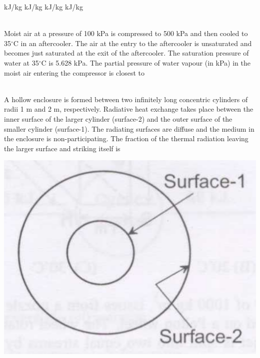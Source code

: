 \documentclass[addpoints,11pt]{exam}
\begin{document}
\begin{questions}
        \begin{oneparchoices}
             kJ/kg
             kJ/kg
             kJ/kg
             kJ/kg
        \end{oneparchoices}\\

        \question Moist air at a pressure of 100 kPa is compressed to 500 kPa and then cooled to 35$^\circ$C in an aftercooler. The air at the entry to the aftercooler is unsaturated and becomes just saturated at the exit of the aftercooler. The saturation pressure of water at 35$^\circ$C is 5.628 kPa. The partial pressure of water vapour (in kPa) in the moist air entering the compressor is closest to\\

        \begin{oneparchoices}
        \end{oneparchoices}\\

        \question A hollow enclosure is formed between two infinitely long concentric cylinders of radii 1 m and 2 m, respectively. Radiative heat exchange takes place between the inner surface of the larger cylinder (surface-2) and the outer surface of the smaller cylinder (surface-1). The radiating surfaces are diffuse and the medium in the enclosure is non-participating. The fraction of the thermal radiation leaving the larger surface and striking itself is

        \begin{center}
            \includegraphics[scale=0.3]{q54}
        \end{center}


\end{questions}
\end{document}
